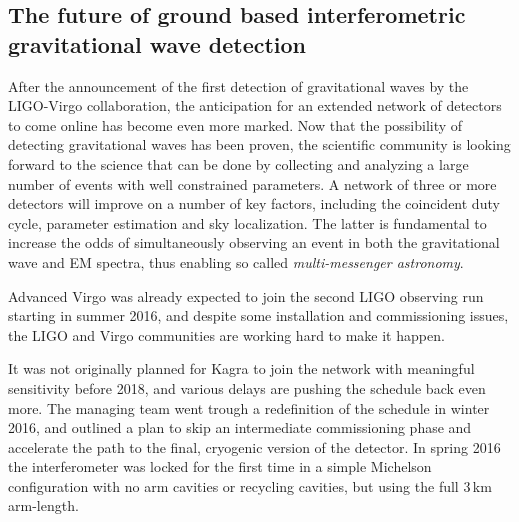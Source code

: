\subsection{The future of ground based interferometric gravitational wave detection}\label{subsec:future}

After the announcement of the first detection of gravitational waves by the LIGO-Virgo collaboration, the anticipation for an extended network of detectors to come online has become even more marked.
Now that the possibility of detecting gravitational waves has been proven, the scientific community is looking forward to the science that can be done by collecting and analyzing a large number of events with well constrained parameters.
A network of three or more detectors will improve on a number of key factors, including the coincident duty cycle, parameter estimation and sky localization. The latter is fundamental to increase the odds of simultaneously observing an event in both the gravitational wave and EM spectra, thus enabling so called \textit{multi-messenger astronomy}.

Advanced Virgo was already expected to join the second LIGO observing run starting in summer 2016, and despite some installation and commissioning issues, the LIGO and Virgo communities are working hard to make it happen.

It was not originally planned for Kagra to join the network with meaningful sensitivity before 2018, and various delays are pushing the schedule back even more. 
The managing team went trough a redefinition of the schedule in winter 2016, and outlined a plan to skip an intermediate commissioning phase and accelerate the path to the final, cryogenic version of the detector. 
In spring 2016 the interferometer was locked for the first time in a simple Michelson configuration with no arm cavities or recycling cavities, but using the full 3\,km arm-length.

